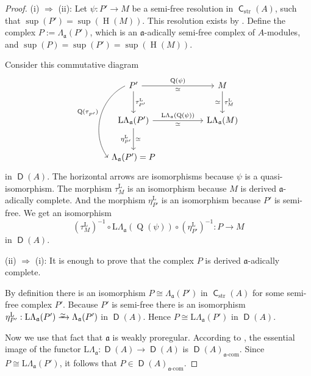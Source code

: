 \documentclass[10pt]{amsart}
\theoremstyle{definition}
\numberwithin{equation}{section}
\newcommand{\iso}{\xrightarrow{%
\smash{\raisebox{-0.5ex}{\ensuremath{\scriptstyle \simeq  \mspace{2mu}}}}}}
\newcommand{\opn}{\operatorname}
\newcommand{\cat}[1]{\operatorname{\mathsf{#1}}}
\newcommand{\mfrak}[1]{\mathfrak{#1}}
\newcommand{\mrm}[1]{\mathrm{#1}}
\newcommand{\La}{\Lambda}
\renewcommand{\a}{\mfrak{a}}
\newcommand{\tup}[1]{\textrm{#1}}
\begin{document}
\begin{proof}
(i) $\Rightarrow$ (ii):
Let $\psi : P' \to  M$ be a semi-free resolution in
$\cat{C}_{\mrm{str}}(A)$, such that
$\opn{sup}(P') = \opn{sup}(\opn{H}(M))$.
This resolution exists by \cite[Theorem 11.4.17 and Corollary 11.4.27]{Ye5}.
Define the complex $P := \La_{\a}(P')$,
which is an $\a$-adically semi-free complex of $A$-modules, and
$\opn{sup}(P) = \opn{sup}(P') = \opn{sup}(\opn{H}(M))$.

Consider this commutative diagram
\begin{equation} \label{eqn:405}
\begin{tikzcd} [column sep = 12ex, row sep = 6ex]
P'
\ar[d, "{\tau^{\mrm{L}}_{P'}}"]
\ar[r, "{\opn{Q}(\psi)}", "{\simeq}"']
\arrow[dd, bend right = 50, start anchor = west, end anchor = west,
"{\opn{Q}(\tau^{}_{P'})}"']
&
M
\ar[d, "{\tau^{\mrm{L}}_M}", "{\simeq}"']
\\
\mrm{L} \La_{\a}(P')
\ar[r, "{\mrm{L} \La_{\a}(\opn{Q}(\psi))}", "{\simeq}"']
\ar[d, "{\eta^{\mrm{L}}_{P'}}"', "{\simeq}"]
&
\mrm{L} \La_{\a}(M)
\\
\La_{\a}(P') = P
\end{tikzcd}
\end{equation}
in $\cat{D}(A)$.
The horizontal arrows are isomorphisms because $\psi$ is a quasi-isomorphism.
The morphism $\tau^{\mrm{L}}_M$ is an isomorphism because $M$ is derived
$\a$-adically  complete. And the morphism $\eta^{\mrm{L}}_{P'}$ is an
isomorphism because $P'$
is semi-free. We get an isomorphism
\[ (\tau^{\mrm{L}}_M)^{-1} \circ \mrm{L} \La_{\a}(\opn{Q}(\psi))
\circ (\eta^{\mrm{L}}_{P'})^{-1} : P \to M \]
in $\cat{D}(A)$.

\medskip \noindent
(ii) $\Rightarrow$ (i):
It is enough to prove that the complex $P$ is derived $\a$-adically complete.

By definition there is an isomorphism
$P \cong \La_{\a}(P')$ in $\cat{C}_{\mrm{str}}(A)$ for some semi-free complex
$P'$. Because $P'$ is semi-free there is an isomorphism
$\eta^{\mrm{L}}_{P'} : \mrm{L} \La_{\a}(P') \iso \La_{\a}(P')$
in $\cat{D}(A)$. Hence
$P \cong \mrm{L} \La_{\a}(P')$ in $\cat{D}(A)$.

Now we use that fact that $\a$ is weakly proregular.
According to \cite[Theorem 1.1]{PSY1},
the essential image of the functor
$\mrm{L} \La_{\a} : \cat{D}(A) \to \cat{D}(A)$
is $\cat{D}(A)_{\tup{$\a$-com}}$.
Since $P \cong \mrm{L} \La_{\a}(P')$, it follows that
$P \in \cat{D}(A)_{\tup{$\a$-com}}$.
\end{proof}
\end{document}
